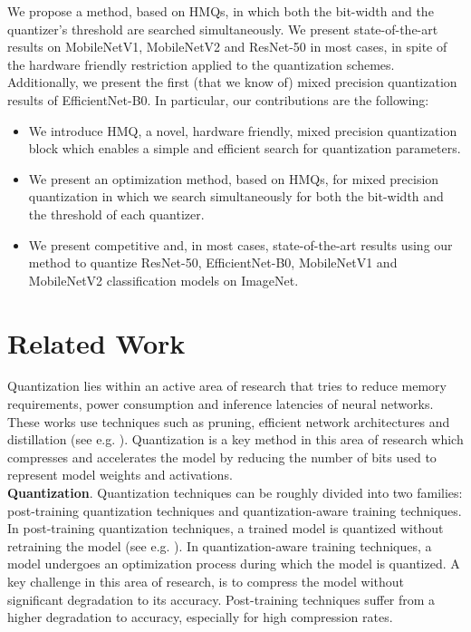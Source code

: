 \documentclass{article}
\newcommand{\qb}{HMQ}
\begin{document}
We propose a method, based on \qb s, in which both the bit-width and the quantizer's threshold are searched simultaneously. 
We present state-of-the-art results on MobileNetV1, MobileNetV2 and ResNet-50 in most cases, in spite of the hardware friendly restriction applied to the quantization schemes.
Additionally, we present the first (that we know of) mixed precision quantization results of \mbox{EfficientNet-B0}.
In particular, our contributions are the following:
\begin{itemize}
	\item We introduce \qb, a novel, hardware friendly, mixed precision quantization block which enables a simple and efficient search for quantization parameters.
	\item We present an optimization method, based on \qb s, for mixed precision quantization in which we search simultaneously for both the bit-width and the threshold of each quantizer.
	\item We present competitive and, in most cases, state-of-the-art results using our method to quantize ResNet-50, EfficientNet-B0, MobileNetV1 and MobileNetV2 classification models on ImageNet.
\end{itemize}





 \section{Related Work}\label{sec:related}
Quantization lies within an active area of research that tries to reduce memory requirements, power consumption and inference latencies of neural networks.
These works use techniques such as pruning, efficient network architectures and distillation (see e.g. \cite{chen2017learning,gholami2018squeezenext,han2015deep,he2019filter,he2017channel,howard2017mobilenets,liu2017learning,molchanov2016pruning,polino2018model,sandler2018mobilenetv2,tan2019efficientnet,zhang2018shufflenet}).
Quantization is a key method in this area of research which compresses and accelerates the model by reducing the number of bits used to represent model weights and activations.\\

\textbf{Quantization}. Quantization techniques can be roughly divided into two families: post-training quantization techniques and quantization-aware training techniques.
In post-training quantization techniques, a trained model is quantized without retraining the model (see e.g. \cite{banner2019post,cai2020zeroq}).
In quantization-aware training techniques, a model undergoes an optimization process during which the model is quantized.
A key challenge in this area of research, is to compress the model without significant degradation to its accuracy.
Post-training techniques suffer from a higher degradation to accuracy, especially for high compression rates.
\end{document}
